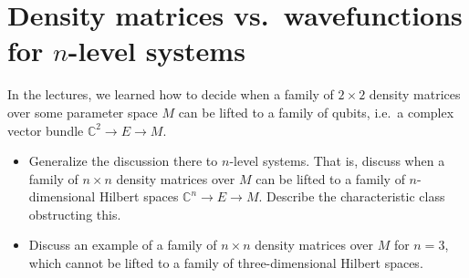 \documentclass[11pt,a4paper]{article}
\def\bC{\mathbb{C}}
\begin{document}
\section{Density matrices vs.~wavefunctions for $n$-level systems}

In the lectures, we learned how to decide when a family 
of $2\times 2$ density matrices over some parameter space $M$
can be lifted to a family of qubits, i.e.~a complex vector bundle $\bC^2\to E\to M$.

\begin{itemize}
\item Generalize the discussion there to  $n$-level systems. That is,
discuss when a family of $n\times n$ density matrices over $M$
can be lifted to a family of $n$-dimensional Hilbert spaces $\bC^n\to E\to M$.
Describe the characteristic class obstructing  this.
\item Discuss an example of a family of $n\times n$ density matrices  over $M$ for $n=3$,
which cannot be lifted to a family of three-dimensional Hilbert spaces.
\end{itemize}
\end{document}
